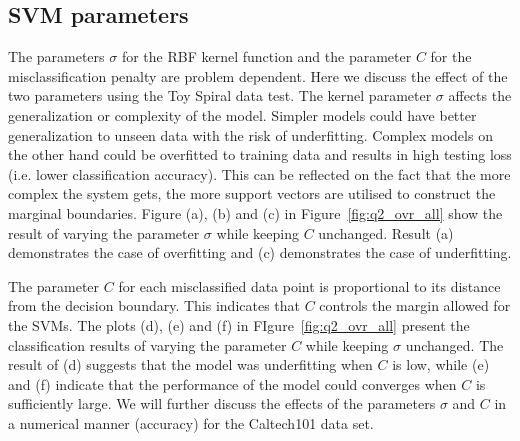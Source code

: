 \documentclass[10pt,twocolumn,letterpaper]{article}
\begin{document}
\subsection{SVM parameters}
The parameters $\sigma$ for the RBF kernel function and the parameter $C$ for the misclassification penalty are problem dependent. Here we discuss the effect of the two parameters using the Toy Spiral data test. The kernel parameter $\sigma$ affects the generalization or complexity of the model. Simpler models could have better generalization to unseen data with the risk of underfitting. Complex models on the other hand could be overfitted to training data and results in high testing loss (i.e. lower classification accuracy). This can be reflected on the fact that the more complex the system gets, the more support vectors are utilised to construct the marginal boundaries. Figure (a), (b) and (c) in Figure~\ref{fig:q2_ovr_all} show the result of varying the parameter $\sigma$ while keeping $C$ unchanged. Result (a) demonstrates the case of overfitting and (c) demonstrates the case of underfitting.

The parameter $C$ for each misclassified data point is proportional to its distance from the decision boundary. This indicates that $C$ controls the margin allowed for the SVMs. The plots (d), (e) and (f) in FIgure~\ref{fig:q2_ovr_all} present the classification results of varying the parameter $C$ while keeping $\sigma$ unchanged. The result of (d) suggests that the model was underfitting when $C$ is low, while (e) and (f) indicate that the performance of the model could converges when $C$ is sufficiently large. We will further discuss the effects of the parameters $\sigma$ and $C$ in a numerical manner (accuracy) for the Caltech101 data set. 
\end{document}
